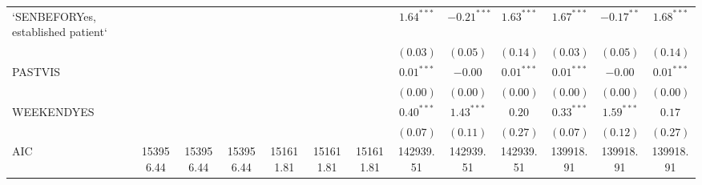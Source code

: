 \documentclass[12pt,twoside]{reedthesis}
\begin{document}
\begin{table}
\begin{center}
\begin{tiny}
\begin{tabular}{l@{} c@{} c@{} c@{} c@{} c@{} c@{} c@{} c@{} c@{} c@{} c@{} c@{} }
  `SENBEFORYes, established patient` &                        &                        &                        &                        &                        &                        & $\mathbf{1.64}^{***}$  & $\mathbf{-0.21}^{***}$ & $\mathbf{1.63}^{***}$  & $\mathbf{1.67}^{***}$  & $-0.17^{**}$           & $\mathbf{1.68}^{***}$  \\
                                     &                        &                        &                        &                        &                        &                        & $(0.03)$               & $(0.05)$               & $(0.14)$               & $(0.03)$               & $(0.05)$               & $(0.14)$               \\
  PASTVIS                            &                        &                        &                        &                        &                        &                        & $\mathbf{0.01}^{***}$  & $-0.00$                & $\mathbf{0.01}^{***}$  & $\mathbf{0.01}^{***}$  & $-0.00$                & $\mathbf{0.01}^{***}$  \\
                                     &                        &                        &                        &                        &                        &                        & $(0.00)$               & $(0.00)$               & $(0.00)$               & $(0.00)$               & $(0.00)$               & $(0.00)$               \\
  WEEKENDYES                         &                        &                        &                        &                        &                        &                        & $\mathbf{0.40}^{***}$  & $\mathbf{1.43}^{***}$  & $0.20$                 & $\mathbf{0.33}^{***}$  & $\mathbf{1.59}^{***}$  & $0.17$                 \\
                                     &                        &                        &                        &                        &                        &                        & $(0.07)$               & $(0.11)$               & $(0.27)$               & $(0.07)$               & $(0.12)$               & $(0.27)$               \\
  \midrule
  AIC                                & 153956.44              & 153956.44              & 153956.44              & 151611.81              & 151611.81              & 151611.81              & 142939.51              & 142939.51              & 142939.51              & 139918.91              & 139918.91              & 139918.91              \\

\end{tabular}
\end{tiny}
\end{center}
\end{table}
\end{document}
